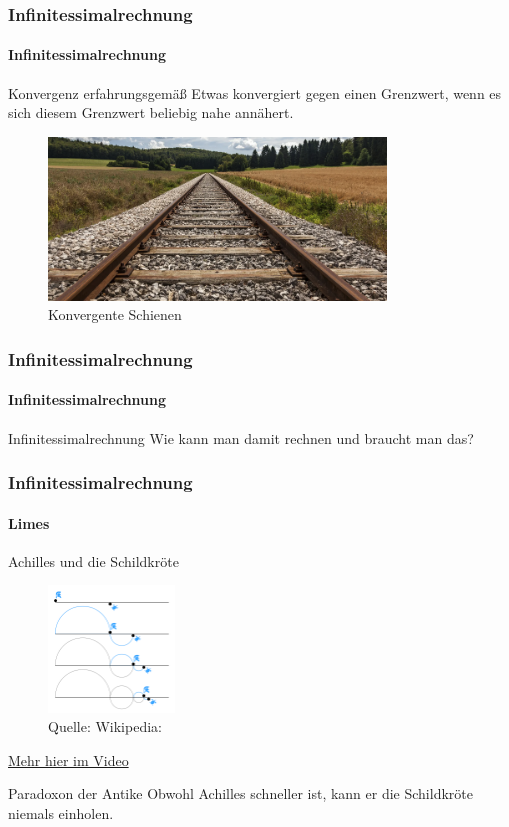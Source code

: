 \documentclass{beamer}
\begin{document}
 \begin{frame}
    \frametitle{Infinitessimalrechnung}
\framesubtitle{Infinitessimalrechnung}
    \begin{block}{Konvergenz erfahrungsgemäß}
Etwas  konvergiert gegen einen Grenzwert, 
wenn es sich diesem Grenzwert beliebig nahe annähert.
\end{block}

    \begin{figure}[H]
          \centering
        \includegraphics[width=0.8\textwidth]{images/limit}
          \caption{Konvergente Schienen}
    \end{figure}

\end{frame}


\begin{frame}
    \frametitle{Infinitessimalrechnung}
\framesubtitle{Infinitessimalrechnung}
    \begin{block}{Infinitessimalrechnung}
        Wie kann man damit rechnen und braucht man das?
\end{block}
 \end{frame}


 \begin{frame}
    \frametitle{Infinitessimalrechnung}
\framesubtitle{Limes}
    \begin{block}{Achilles und die Schildkröte}
\begin{figure}[H]
      \centering
    \includegraphics[width=0.3\textwidth]{images/Zeno_Achilles_Paradox}
      \caption{Quelle: Wikipedia: }
\end{figure}
\href{https://www.youtube.com/watch?v=X8Qksx_Ng9k}{Mehr hier im Video}
\end{block}
  \begin{block}{Paradoxon der Antike}
 Obwohl Achilles schneller ist, kann er die Schildkröte niemals einholen.
\end{block}
 \end{frame}
\end{document}
